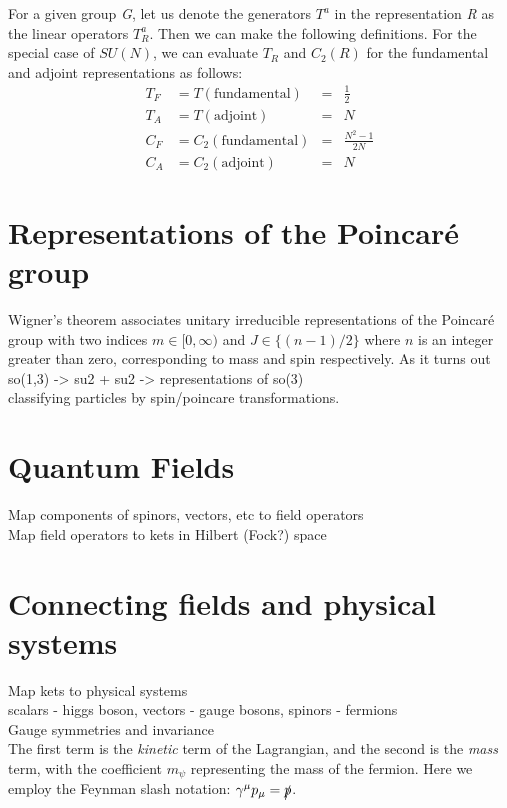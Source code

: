 
For a given group \emph{G}, let us denote the generators $T^a$ in the representation \emph{R} as the linear operators $T_R^a$. Then we can make the following definitions.
For the special case of $SU(N)$, we can evaluate $T_R$ and $C_2(R)$ for the fundamental and adjoint representations as follows:
\begin{align}
  T_F &= T(\text{fundamental}) &=& \frac{1}{2}\\
  T_A &= T(\text{adjoint}) &=& N\\
  C_F &= C_2(\text{fundamental}) &=& \frac{N^2-1}{2N}\\
  C_A &= C_2(\text{adjoint}) &=& N
\end{align}

\section{Representations of the Poincar\'e group}

Wigner's theorem associates unitary irreducible representations of the Poincar\'e group with two indices $m\in[0,\infty)$ and $J\in\{(n-1)/2\}$ where $n$ is an integer greater than zero, corresponding to mass and spin respectively. As it turns out
so(1,3) -> su2 + su2 -> representations of so(3)\\
classifying particles by spin/poincare transformations.\\
\section{Quantum Fields}
Map components of spinors, vectors, etc to field operators \\
Map field operators to kets in Hilbert (Fock?) space \\
\section{Connecting fields and physical systems}
Map kets to physical systems\\
scalars - higgs boson, vectors - gauge bosons, spinors - fermions\\

Gauge symmetries and invariance\\
The first term is the \emph{kinetic} term of the Lagrangian, and the second is the \emph{mass} term, with the coefficient $m_\psi$ representing the mass of the fermion. Here we employ the Feynman slash notation: $\gamma^\mu p_\mu = \slashed{p}$. 
